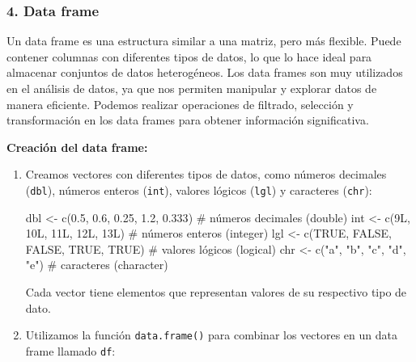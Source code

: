 \documentclass[
  jou,
  floatsintext,
  longtable,
  a4paper,
  nolmodern,
  notxfonts,
  notimes,
  12pt,
  colorlinks=true,linkcolor=blue,citecolor=blue,urlcolor=blue]{apa7}
\newenvironment{Shaded}{\begin{snugshade}}{\end{snugshade}}
\newcommand{\CommentTok}[1]{\textcolor[rgb]{0.37,0.37,0.37}{#1}}
\newcommand{\ConstantTok}[1]{\textcolor[rgb]{0.56,0.35,0.01}{#1}}
\newcommand{\DecValTok}[1]{\textcolor[rgb]{0.68,0.00,0.00}{#1}}
\newcommand{\FloatTok}[1]{\textcolor[rgb]{0.68,0.00,0.00}{#1}}
\newcommand{\FunctionTok}[1]{\textcolor[rgb]{0.28,0.35,0.67}{#1}}
\newcommand{\NormalTok}[1]{\textcolor[rgb]{0.00,0.23,0.31}{#1}}
\newcommand{\OtherTok}[1]{\textcolor[rgb]{0.00,0.23,0.31}{#1}}
\newcommand{\StringTok}[1]{\textcolor[rgb]{0.13,0.47,0.30}{#1}}
\begin{document}
\subsubsection{4. Data frame}\label{data-frame}

Un data frame es una estructura similar a una matriz, pero más flexible.
Puede contener columnas con diferentes tipos de datos, lo que lo hace
ideal para almacenar conjuntos de datos heterogéneos. Los data frames
son muy utilizados en el análisis de datos, ya que nos permiten
manipular y explorar datos de manera eficiente. Podemos realizar
operaciones de filtrado, selección y transformación en los data frames
para obtener información significativa.

\textbf{Creación del data frame:}

\begin{enumerate}
\def\labelenumi{\arabic{enumi}.}
\item
  Creamos vectores con diferentes tipos de datos, como números decimales
  (\texttt{dbl}), números enteros (\texttt{int}), valores lógicos
  (\texttt{lgl}) y caracteres (\texttt{chr}):

\begin{Shaded}
\begin{Highlighting}[]
\NormalTok{dbl }\OtherTok{\textless{}{-}} \FunctionTok{c}\NormalTok{(}\FloatTok{0.5}\NormalTok{, }\FloatTok{0.6}\NormalTok{, }\FloatTok{0.25}\NormalTok{, }\FloatTok{1.2}\NormalTok{, }\FloatTok{0.333}\NormalTok{) }\CommentTok{\# números decimales (double)}
\NormalTok{int }\OtherTok{\textless{}{-}} \FunctionTok{c}\NormalTok{(}\DecValTok{9}\NormalTok{L, }\DecValTok{10}\NormalTok{L, }\DecValTok{11}\NormalTok{L, }\DecValTok{12}\NormalTok{L, }\DecValTok{13}\NormalTok{L) }\CommentTok{\# números enteros (integer)}
\NormalTok{lgl }\OtherTok{\textless{}{-}} \FunctionTok{c}\NormalTok{(}\ConstantTok{TRUE}\NormalTok{, }\ConstantTok{FALSE}\NormalTok{, }\ConstantTok{FALSE}\NormalTok{, }\ConstantTok{TRUE}\NormalTok{, }\ConstantTok{TRUE}\NormalTok{) }\CommentTok{\# valores lógicos (logical)}
\NormalTok{chr }\OtherTok{\textless{}{-}} \FunctionTok{c}\NormalTok{(}\StringTok{"a"}\NormalTok{, }\StringTok{"b"}\NormalTok{, }\StringTok{"c"}\NormalTok{, }\StringTok{"d"}\NormalTok{, }\StringTok{"e"}\NormalTok{) }\CommentTok{\# caracteres (character)}
\end{Highlighting}
\end{Shaded}

  Cada vector tiene elementos que representan valores de su respectivo
  tipo de dato.
\item
  Utilizamos la función \texttt{data.frame()} para combinar los vectores
  en un data frame llamado \texttt{df}:


\end{enumerate}
\end{document}
